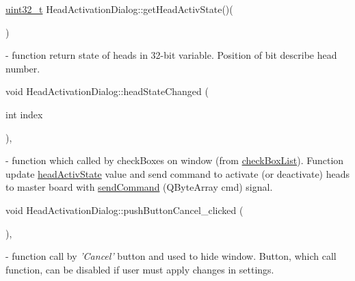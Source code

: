 \mbox{\label{classHeadActivationDialog_aa96f7a5383ade62d5bdf21fd2defac75}} 
{\footnotesize\ttfamily \mbox{\hyperlink{settings_8h_a4196118492a3b1493c81f250e90af775}{uint32\+\_\+t}} Head\+Activation\+Dialog\+::\texorpdfstring{get\+Head\+Activ\+State()}{getHeadActivState}(\begin{DoxyParamCaption}{ }\end{DoxyParamCaption})} - function return state of heads in 32-bit variable. Position of bit describe head number.

\mbox{\label{classHeadActivationDialog_a2a6c18f85c6e70dcd242f29b14b44219}} 
{\footnotesize\ttfamily void Head\+Activation\+Dialog\+::\texorpdfstring{head\+State\+Changed}{headStateChanged} (\begin{DoxyParamCaption}\item[{int}]{index }\end{DoxyParamCaption}){\ttfamily [private]}, {\ttfamily [slot]}} - function which called by check\+Boxes on window (from \hyperlink{classHeadActivationDialog_ae6fb828d26fda5b86510b5e427f24d06}{check\+Box\+List}). Function update \hyperlink{classHeadActivationDialog_a720bae08173514106fd2bdfda9a8e902}{head\+Activ\+State} value and send command to activate (or deactivate) heads to master board with \hyperlink{classHeadActivationDialog_ae76f8ea5faecab0d161904b14d925bda}{send\+Command} (Q\+Byte\+Array cmd) signal. 

\mbox{\label{classHeadActivationDialog_af75039537fd16f02263e12343f7655c6}} 
{\footnotesize\ttfamily void Head\+Activation\+Dialog\+::\texorpdfstring{push\+Button\+Cancel\+\_\+clicked}{pushButtonCancel\_clicked} (\begin{DoxyParamCaption}{ }\end{DoxyParamCaption}){\ttfamily [private]}, {\ttfamily [slot]}} - function call by \textit{'Cancel'} button and used to hide window. Button, which call function, can be disabled if user must apply changes in settings.


